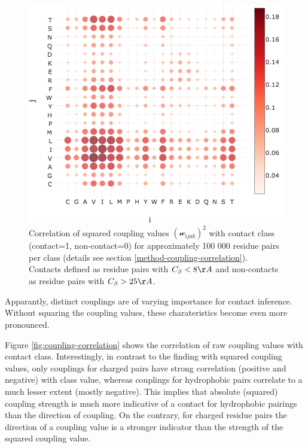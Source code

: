 \documentclass[12pt,a4paper,twoside]{book}
\newcommand{\Cb}{C_\beta}
\newcommand{\wijab}{\mathcal{w}_{ijab}}
\theoremstyle{definition}
\theoremstyle{definition}
\theoremstyle{remark}
\begin{document}
\begin{figure}

{\centering \includegraphics[width=0.9\linewidth]{img/coupling_matrix_analysis/correlation_squared_couplings_with_contact_class_notitle} 

}

\caption{Correlation of squared coupling values
\((\wijab)^2\) with contact class (contact=1, non-contact=0) for
approximately 100 000 residue pairs per class (details see section
\ref{method-coupling-correlation}). Contacts defined as residue pairs
with \(\Cb < 8 \AA\) and non-contacts as residue pairs with
\(\Cb > 25 \AA\).}\label{fig:sq-coupling-correlation}
\end{figure}

Apparantly, distinct couplings are of varying importance for contact
inference. Without squaring the coupling values, these charateristics
become even more pronounced.

Figure \ref{fig:coupling-correlation} shows the correlation of raw
coupling values with contact class. Interestingly, in contrast to the
finding with squared coupling values, only couplings for charged pairs
have strong correlation (positive and negative) with class value,
whereas couplings for hydrophobic pairs correlate to a much lesser
extent (mostly negative). This implies that absolute (squared) coupling
strength is much more indicative of a contact for hydrophobic pairings
than the direction of coupling. On the contrary, for charged residue
pairs the direction of a coupling value is a stronger indicator than the
strength of the squared coupling value.
\end{document}
